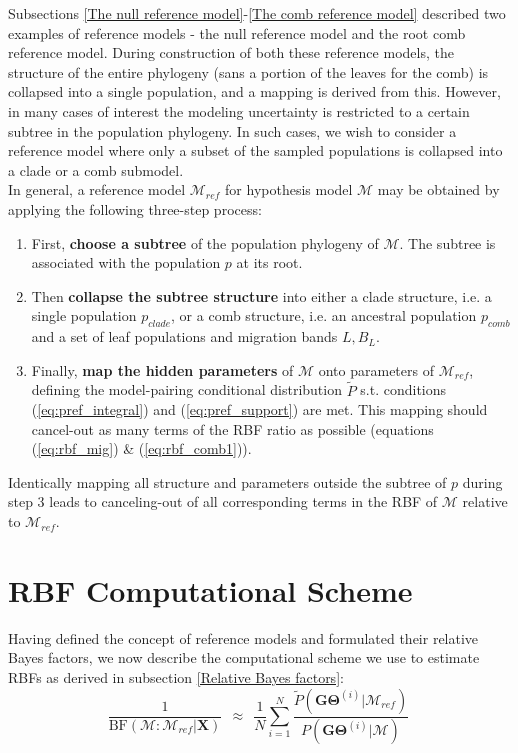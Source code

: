 \documentclass[11pt]{article}
\newcommand{\vect}[1]{\boldsymbol{\mathbf{#1}}}
\newcommand{\X}{\vect{X}}
\newcommand{\M}{\mathcal{M}}
\newcommand{\G}{\vect{G}}
\newcommand{\T}{\vect{\Theta}}
\newcommand{\GT}{\G\T}
\newcommand{\Mref}{\M_{ref}}
\newcommand{\Pref}{\widetilde{P}}
\newcommand{\rbf}{\text{BF}}
\newcommand{\1}{\mathbbm{1}}
\begin{document}
Subsections \ref{The null reference model}-\ref{The comb reference model} described two examples of reference models - the null reference model and the root comb reference model. 
%
During construction of both these reference models, the structure of the entire phylogeny (sans a portion of the leaves for the comb) is collapsed into a single population, and a mapping is derived from this.
%
However, in many cases of interest the modeling uncertainty is restricted to a certain subtree in the population phylogeny.
%
In such cases, we wish to consider a reference model where only a subset of the sampled populations is collapsed into a clade or a comb submodel.\\
%
In general, a reference model $\Mref$ for hypothesis model $\M$ may be obtained by applying the following three-step process:

\begin{enumerate}
\item First, \textbf{choose a subtree} of the population phylogeny of $\M$. The subtree is associated with the population $p$ at its root. 

\item Then \textbf{collapse the subtree structure} into either a clade structure, i.e. a single population $p_{clade}$, or a comb structure, i.e. an ancestral population $p_{comb}$ and a set of leaf populations and migration bands $L, B_L$. 

\item Finally, \textbf{map the hidden parameters} of $\M$ onto parameters of $\Mref$, defining the model-pairing conditional distribution $\Pref$ s.t. conditions (\ref{eq:pref_integral}) and (\ref{eq:pref_support}) are met. This mapping should cancel-out as many terms of the RBF ratio as possible (equations (\ref{eq:rbf_mig}) \& (\ref{eq:rbf_comb1})).
\end{enumerate}

Identically mapping all structure and parameters outside the subtree of $p$ during step 3 leads to canceling-out of all corresponding terms in the RBF of $\M$ relative to $\Mref$.

\section{RBF Computational Scheme}
\label{sec:RBF Computational Scheme}

Having defined the concept of reference models and formulated their relative Bayes factors, we now describe the computational scheme we use to estimate RBFs as derived in subsection \ref{Relative Bayes factors}:
%
\begin{equation}
\label{eq:computational_scheme}
 \frac{1}{\rbf(\M:\Mref|\X)}  ~~\approx~~ \frac{1}{N} \sum_{i=1}^{N}\frac{\Pref(\GT^{(i)}|\Mref) }{P(\GT^{(i)}|\M)} ~ 
\end{equation}
\end{document}
